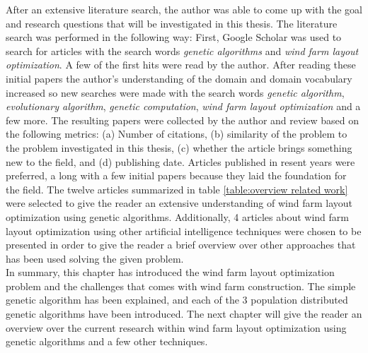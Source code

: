 \noindent After an extensive literature search, the author was able to come up with the goal and research questions that will be investigated in this thesis. The literature search was performed in the following way: First, Google Scholar was used to search for articles with the search words \textit{genetic algorithms} and \textit{wind farm layout optimization}. A few of the first hits were read by the author. After reading these initial papers the author's understanding of the domain and domain vocabulary increased so new searches were made with the search words  \textit{genetic algorithm}, \textit{evolutionary algorithm}, \textit{genetic computation}, \textit{wind farm layout optimization} and a few more. The resulting papers were collected by the author and review based on the following metrics: (a) Number of citations, (b) similarity of the problem to the problem investigated in this thesis, (c) whether the article brings something new to the field, and (d) publishing date. Articles published in resent years were preferred, a long with a few initial papers because they laid the foundation for the field. The twelve articles summarized in table \ref{table:overview related work} were selected to give the reader an extensive understanding of wind farm layout optimization using genetic algorithms. Additionally, 4 articles about wind farm layout optimization using other artificial intelligence techniques were chosen to be presented in order to give the reader a brief overview over other approaches that has been used solving the given problem. \\

\noindent In summary, this chapter has introduced the wind farm layout optimization problem and the challenges that comes with wind farm construction. The simple genetic algorithm has been explained, and each of the 3 population distributed genetic algorithms have been introduced. The next chapter will give the reader an overview over the current research within wind farm layout optimization using genetic algorithms and a few other techniques.\\
